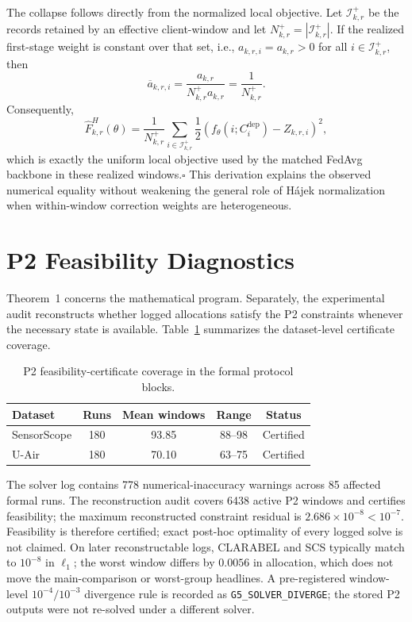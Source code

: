 The collapse follows directly from the normalized local objective.  Let
$\mathcal I_{k,r}^{+}$ be the records retained by an effective client-window
and let $N_{k,r}^{+}=|\mathcal I_{k,r}^{+}|$.  If the realized first-stage
weight is constant over that set, i.e.,
$a_{k,r,i}=a_{k,r}>0$ for all $i\in\mathcal I_{k,r}^{+}$, then
\begin{equation}
 \overline a_{k,r,i}
 =
 \frac{a_{k,r}}
 {N_{k,r}^{+}a_{k,r}}
 =
 \frac{1}{N_{k,r}^{+}}.
 \label{eq:app_local_hajek_uniform}
\end{equation}
Consequently,
\begin{equation}
 \widehat F^H_{k,r}(\theta)
 =
 \frac{1}{N_{k,r}^{+}}
 \sum_{i\in\mathcal I_{k,r}^{+}}
 \frac{1}{2}
 \left(
 f_\theta(i;C_i^{\mathrm{dep}})-Z_{k,r,i}
 \right)^2,
 \label{eq:app_local_hajek_collapse}
\end{equation}
which is exactly the uniform local objective used by the matched FedAvg
backbone in these realized windows.\hfill$\square$  This derivation explains the observed
numerical equality without weakening the general role of H\'ajek normalization
when within-window correction weights are heterogeneous.


\section{P2 Feasibility Diagnostics}
\label{app:p2_diagnostics}

Theorem~1 concerns the mathematical program.  Separately, the
experimental audit reconstructs whether logged allocations satisfy the P2
constraints whenever the necessary state is available.  Table~\ref{tab:app_p2_coverage}
summarizes the dataset-level certificate coverage.

\begin{table}[!t]
\centering
\caption{P2 feasibility-certificate coverage in the formal protocol blocks.}
\label{tab:app_p2_coverage}
\footnotesize
\setlength{\tabcolsep}{4pt}
\begin{tabular*}{\columnwidth}{@{\extracolsep{\fill}}lcccc}
\toprule
Dataset & Runs & Mean windows & Range & Status\\
\midrule
SensorScope & 180 & 93.85 & 88--98 & Certified \\
U-Air & 180 & 70.10 & 63--75 & Certified \\
\bottomrule
\end{tabular*}
\end{table}

The solver log contains 778 numerical-inaccuracy warnings across
85 affected formal runs.  The reconstruction audit covers
6438 active P2 windows and certifies feasibility; the maximum
reconstructed constraint residual is
$2.686\times10^{-8}<10^{-7}$.  Feasibility is therefore certified;
exact post-hoc optimality of every logged solve is not claimed.
On later reconstructable logs, CLARABEL and SCS typically match to
$10^{-8}$ in $\ell_1$; the worst window differs by $0.0056$ in
allocation, which does not move the main-comparison or worst-group
headlines.  A pre-registered window-level
$10^{-4}/10^{-3}$ divergence rule is recorded as
\texttt{G5\_SOLVER\_DIVERGE}; the stored P2 outputs were not re-solved under a different solver.

